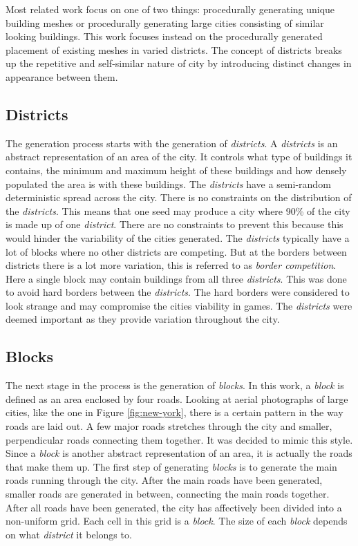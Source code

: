 Most related work focus on one of two things: procedurally generating unique building meshes\cite{PseudoInfiniteCities} or procedurally generating large cities consisting of similar looking buildings\cite{InfiniteCities}. This work focuses instead on the procedurally generated placement of existing meshes in varied districts. The concept of districts breaks up the repetitive and self-similar nature of city by introducing distinct changes in appearance between them.

	\subsection{Districts}
	The generation process starts with the generation of \textit{districts}. A \textit{districts} is an abstract representation of an area of the city. It controls what type of buildings it contains, the minimum and maximum height of these buildings and how densely populated the area is with these buildings. The \textit{districts} have a semi-random deterministic spread across the city. There is no constraints on the distribution of the \textit{districts}. This means that one seed may produce a city where 90\% of the city is made up of one \textit{district}. There are no constraints to prevent this because this would hinder the variability of the cities generated. The \textit{districts} typically have a lot of blocks where no other districts are competing. But at the borders between districts there is a lot more variation, this is referred to as \textit{border competition}. Here a single block may contain buildings from all three \textit{districts}. This was done to avoid hard borders between the \textit{districts}. The hard borders were considered to look strange and may compromise the cities viability in games. The \textit{districts} were deemed important as they provide variation throughout the city.
		
	\subsection{Blocks}
	The next stage in the process is the generation of \textit{blocks}. In this work, a \textit{block} is defined as an area enclosed by four roads. Looking at aerial photographs of large cities, like the one in Figure \ref{fig:new-york}, there is a certain pattern in the way roads are laid out. A few major roads stretches through the city and smaller, perpendicular roads connecting them together. It was decided to mimic this style. Since a \textit{block} is another abstract representation of an area, it is actually the roads that make them up. The first step of generating \textit{blocks} is to generate the main roads running through the city. After the main roads have been generated, smaller roads are generated in between, connecting the main roads together. After all roads have been generated, the city has affectively been divided into a non-uniform grid. Each cell in this grid is a \textit{block}. The size of each \textit{block} depends on what \textit{district} it belongs to.
	
